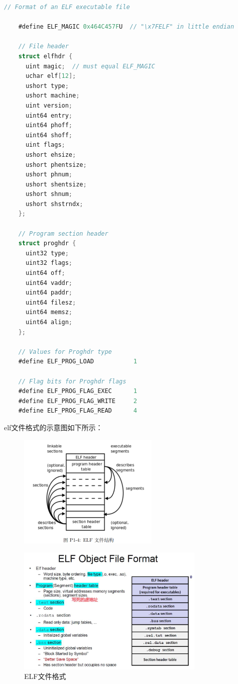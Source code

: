 \documentclass[UTF8]{article}
\begin{document}
\begin{lstlisting}[language=C]
    // Format of an ELF executable file

    #define ELF_MAGIC 0x464C457FU  // "\x7FELF" in little endian
    
    // File header
    struct elfhdr {
      uint magic;  // must equal ELF_MAGIC
      uchar elf[12];
      ushort type;
      ushort machine;
      uint version;
      uint64 entry;
      uint64 phoff;
      uint64 shoff;
      uint flags;
      ushort ehsize;
      ushort phentsize;
      ushort phnum;
      ushort shentsize;
      ushort shnum;
      ushort shstrndx;
    };
    
    // Program section header
    struct proghdr {
      uint32 type;
      uint32 flags;
      uint64 off;
      uint64 vaddr;
      uint64 paddr;
      uint64 filesz;
      uint64 memsz;
      uint64 align;
    };
    
    // Values for Proghdr type
    #define ELF_PROG_LOAD           1
    
    // Flag bits for Proghdr flags
    #define ELF_PROG_FLAG_EXEC      1
    #define ELF_PROG_FLAG_WRITE     2
    #define ELF_PROG_FLAG_READ      4
\end{lstlisting}

elf文件格式的示意图如下所示：

\begin{figure}[H]
    \centering
    \includegraphics[width=0.6\textwidth]{elfformat2.jpg}
\end{figure}

\begin{figure}[H]
    \centering
    \includegraphics[width=0.8\textwidth]{elfformat1.png}
    \caption{ELF文件格式}
\end{figure}
\end{document}
